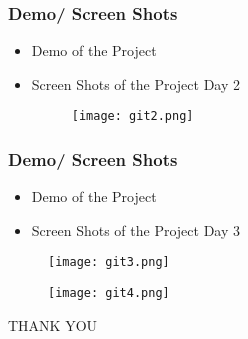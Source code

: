 \documentclass{beamer}
\begin{document}
    
    \begin{frame}
	\frametitle{Demo/ Screen Shots}
	\begin{itemize}
	    \item Demo of the Project
	    \item Screen Shots of the Project Day 2
		\begin{figure}
	        \centering
	        \texttt{[image: git2.png]}
	        
	    \end{figure}
	\end{itemize}
    \end{frame}
    \begin{frame}
    \frametitle{Demo/ Screen Shots}
    \begin{itemize}
        \item Demo of the Project 
        \item Screen Shots of the Project Day 3
    \end{itemize}
    \begin{figure}
        \centering
        \texttt{[image: git3.png]}
        
    \end{figure}
    \end{frame}
    
    \begin{frame}
    \begin{figure}
        \centering
        \texttt{[image: git4.png]}
        \end{figure}
        \end{frame}
    
     \begin{frame}
	\begin{center}
	     THANK YOU
	\end{center}
    \end{frame}
\end{document}
